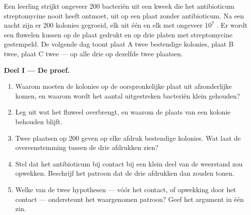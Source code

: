 \begin{problem}
\label{pb:g11:mutations:1}
Een leerling strijkt ongeveer 200 bacteriën uit een kweek die het
antibioticum streptomycine nooit heeft ontmoet, uit op een plaat zonder
antibioticum. Na een nacht zijn er 200 kolonies gegroeid, elk uit één 
en elk met ongeveer $10^7$ . Er wordt een fluwelen kussen op de
plaat gedrukt en op drie platen met streptomycine gestempeld. De volgende
dag toont plaat A twee bestendige kolonies, plaat B twee, plaat C twee
--- op alle drie op dezelfde twee plaatsen.

\medskip
\noindent\textbf{Deel I --- De proef.}
\begin{enumerate}
  \item Waarom moeten de kolonies op de oorspronkelijke plaat uit
        afzonderlijke  komen, en waarom wordt het aantal
        uitgestreken bacteriën klein gehouden?
  \item Leg uit wat het fluweel overbrengt, en waarom de plaats van een
        kolonie behouden blijft.
  \item Twee plaatsen op 200 geven op elke afdruk bestendige kolonies.
        Wat laat de overeenstemming tussen de drie afdrukken zien?
  \item Stel dat het antibioticum bij contact bij een klein deel van de
         weerstand zou opwekken. Beschrijf het patroon dat de drie
        afdrukken dan zouden tonen.
  \item Welke van de twee hypothesen ---  vóór het contact, of
        opwekking door het contact --- ondersteunt het waargenomen
        patroon? Geef het argument in één zin.
\end{enumerate}


\end{problem}
